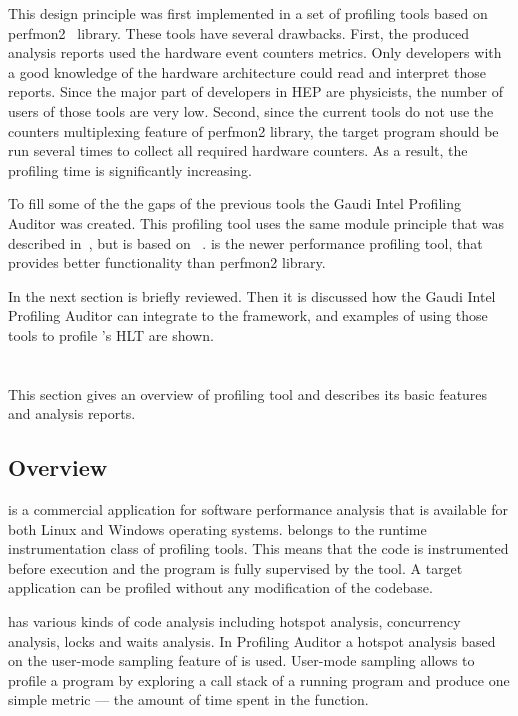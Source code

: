 This design principle was first implemented in a set of profiling tools based
on perfmon2~\cite{perfmon2} library. These tools have several drawbacks. First,
the produced analysis reports  used the  hardware event counters metrics. Only
developers with a good knowledge of the hardware  architecture could read and
interpret those reports. Since the major part of developers in HEP are
physicists, the number of users of those tools are very low. Second, since the
current tools do not use the counters multiplexing feature of perfmon2 library,
the target program should be run several times to collect all required hardware
counters. As a result, the profiling time is significantly increasing.

To fill some of the the gaps of the previous tools the Gaudi Intel
Profiling Auditor was created. This profiling tool uses the same module principle that was
described in~\cite{modular}, but is based on \iamp~\cite{vtune}.
\amp is the newer performance profiling tool, that provides better
functionality than perfmon2 library.

In the next section \iamp is briefly reviewed. Then it is discussed how the Gaudi
Intel Profiling Auditor can integrate \amp to the \gaudi framework, and examples 
of using those tools to profile \lhcb's HLT are shown. 

\section[VTune Amplifier]{\iamp}
This section gives an overview of \iamp profiling tool and
describes its basic features and analysis reports.

\subsection{Overview}
\iamp is a commercial application for software performance analysis that is
available for both Linux and Windows operating systems. \amp belongs to the
runtime instrumentation class of profiling tools. This means that the code is
instrumented before execution and the program is fully supervised by the tool.
A target application can be profiled without any modification of the codebase.

\iamp has  various kinds of code analysis including hotspot analysis,
concurrency analysis, locks and waits analysis. In Profiling Auditor a
hotspot analysis based on the user-mode sampling feature of \amp is used.
User-mode sampling allows to profile a program by exploring a call stack of a
running program and produce one simple metric --- the amount of time spent in the
function.

